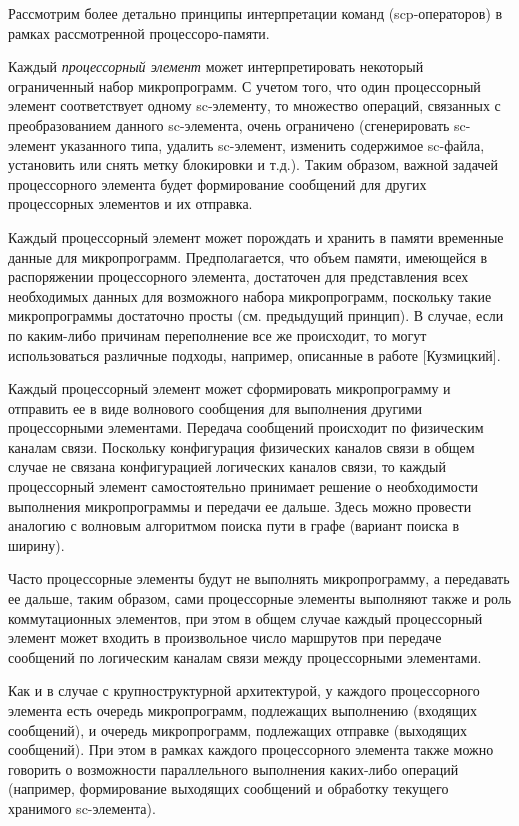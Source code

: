Рассмотрим более детально принципы интерпретации команд (scp-операторов) в рамках рассмотренной процессоро-памяти.
\begin{textitemize}
	\item Каждый \textit{процессорный элемент} может интерпретировать некоторый ограниченный набор микропрограмм. С учетом того, что один процессорный элемент соответствует одному sc-элементу, то множество операций, связанных с преобразованием данного sc-элемента, очень ограничено (сгенерировать sc-элемент указанного типа, удалить sc-элемент, изменить содержимое sc-файла, установить или снять метку блокировки и т.д.). Таким образом, важной задачей процессорного элемента будет формирование сообщений для других процессорных элементов и их отправка.
	\item Каждый процессорный элемент может порождать и хранить в памяти временные данные для микропрограмм. Предполагается, что объем памяти, имеющейся в распоряжении процессорного элемента, достаточен для представления всех необходимых данных для возможного набора микропрограмм, поскольку такие микропрограммы достаточно просты (см. предыдущий принцип). В случае, если по каким-либо причинам переполнение все же происходит, то могут использоваться различные подходы, например, описанные в работе [Кузмицкий].
	\item Каждый процессорный элемент может сформировать микропрограмму и отправить ее в виде волнового сообщения для выполнения другими процессорными элементами. Передача сообщений происходит по физическим каналам связи. Поскольку конфигурация физических каналов связи в общем случае не связана конфигурацией логических каналов связи, то каждый процессорный элемент самостоятельно принимает решение о необходимости выполнения микропрограммы и передачи ее дальше. Здесь можно провести аналогию с волновым алгоритмом поиска пути в графе (вариант поиска в ширину).
	\item Часто процессорные элементы будут не выполнять микропрограмму, а передавать ее дальше, таким образом, сами процессорные элементы выполняют также и роль коммутационных элементов, при этом в общем случае каждый процессорный элемент может входить в произвольное число маршрутов при передаче сообщений по логическим каналам связи между процессорными элементами.
	\item Как и в случае с крупноструктурной архитектурой, у каждого процессорного элемента есть очередь микропрограмм, подлежащих выполнению (входящих сообщений), и очередь микропрограмм, подлежащих отправке (выходящих сообщений). При этом в рамках каждого процессорного элемента также можно говорить о возможности параллельного выполнения каких-либо операций (например, формирование выходящих сообщений и обработку текущего хранимого sc-элемента).
\end{textitemize}

